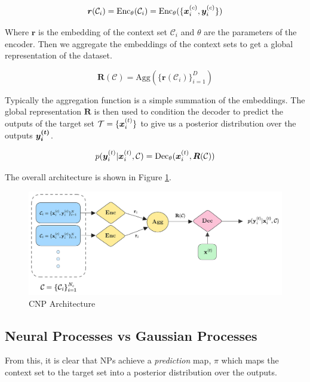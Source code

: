 \documentclass[../../main.tex]{subfiles}
\begin{document}
\begin{equation}
    \bm{r}(\mathcal{C}_i) = \text{Enc}_\theta(\mathcal{C}_i) = \text{Enc}_\theta(\{ \bm{x}_{i}^{(c)}, \bm{y}_i^{(c)} \})
\end{equation}

Where $\bm{r}$ is the embedding of the context set $\mathcal{C}_i$ and $\theta$ are the parameters of the encoder. Then we aggregate the embeddings of the context sets to get a global representation of the dataset. 

\begin{equation}
    \bm{R}(\mathcal{C}) = \text{Agg}(\{ \bm{r}(\mathcal{C}_i) \}_{i=1}^D)
\end{equation}

Typically the aggregation function is a simple summation of the embeddings. The global representation $\bm{R}$ is then used to condition the decoder to predict the outputs of the target set $\mathcal{T} = \{ \bm{x}_{i}^{(t)} \}$ to give us a posterior distribution over the outputs $\bm{y_i^{(t)}}$.

\begin{equation}
    p(\bm{y}_i^{(t)} | \bm{x}_i^{(t)}, \mathcal{C}) = \text{Dec}_\theta(\bm{x}_i^{(t)}, \bm{R}(\mathcal{C}))
\end{equation}

The overall architecture is shown in Figure \ref{fig:cnp-architecture}.

\begin{figure}[H]
	\centering
	\includegraphics[height=0.3\textwidth]{./cnp.png}
	\caption{CNP Architecture}
	\label{fig:cnp-architecture}
\end{figure}

\subsection{Neural Processes vs Gaussian Processes}
\label{aaa}

From this, it is clear that NPs achieve a \emph{prediction} map, $\pi$ which maps the context set to the target set into a posterior distribution over the outputs. 
\end{document}
